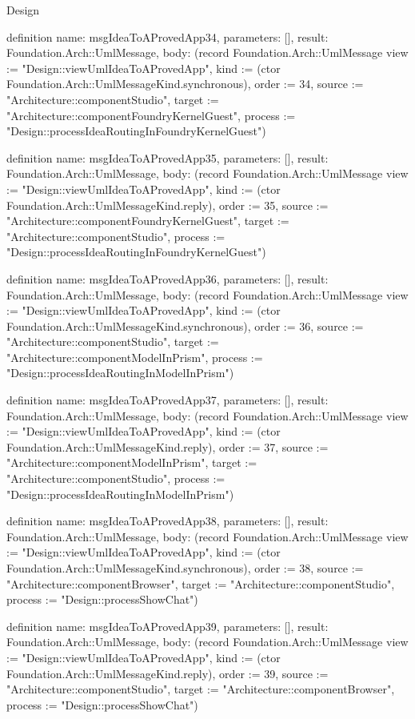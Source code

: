 \begin{lexlean}{Design}
\begin{semanticmodule}
definition{
  name: msgIdeaToAProvedApp34,
  parameters: [],
  result: Foundation.Arch::UmlMessage,
  body: (record Foundation.Arch::UmlMessage {view := "Design::viewUmlIdeaToAProvedApp", kind := (ctor Foundation.Arch::UmlMessageKind.synchronous), order := 34, source := "Architecture::componentStudio", target := "Architecture::componentFoundryKernelGuest", process := "Design::processIdeaRoutingInFoundryKernelGuest"})
}

definition{
  name: msgIdeaToAProvedApp35,
  parameters: [],
  result: Foundation.Arch::UmlMessage,
  body: (record Foundation.Arch::UmlMessage {view := "Design::viewUmlIdeaToAProvedApp", kind := (ctor Foundation.Arch::UmlMessageKind.reply), order := 35, source := "Architecture::componentFoundryKernelGuest", target := "Architecture::componentStudio", process := "Design::processIdeaRoutingInFoundryKernelGuest"})
}

definition{
  name: msgIdeaToAProvedApp36,
  parameters: [],
  result: Foundation.Arch::UmlMessage,
  body: (record Foundation.Arch::UmlMessage {view := "Design::viewUmlIdeaToAProvedApp", kind := (ctor Foundation.Arch::UmlMessageKind.synchronous), order := 36, source := "Architecture::componentStudio", target := "Architecture::componentModelInPrism", process := "Design::processIdeaRoutingInModelInPrism"})
}

definition{
  name: msgIdeaToAProvedApp37,
  parameters: [],
  result: Foundation.Arch::UmlMessage,
  body: (record Foundation.Arch::UmlMessage {view := "Design::viewUmlIdeaToAProvedApp", kind := (ctor Foundation.Arch::UmlMessageKind.reply), order := 37, source := "Architecture::componentModelInPrism", target := "Architecture::componentStudio", process := "Design::processIdeaRoutingInModelInPrism"})
}

definition{
  name: msgIdeaToAProvedApp38,
  parameters: [],
  result: Foundation.Arch::UmlMessage,
  body: (record Foundation.Arch::UmlMessage {view := "Design::viewUmlIdeaToAProvedApp", kind := (ctor Foundation.Arch::UmlMessageKind.synchronous), order := 38, source := "Architecture::componentBrowser", target := "Architecture::componentStudio", process := "Design::processShowChat"})
}

definition{
  name: msgIdeaToAProvedApp39,
  parameters: [],
  result: Foundation.Arch::UmlMessage,
  body: (record Foundation.Arch::UmlMessage {view := "Design::viewUmlIdeaToAProvedApp", kind := (ctor Foundation.Arch::UmlMessageKind.reply), order := 39, source := "Architecture::componentStudio", target := "Architecture::componentBrowser", process := "Design::processShowChat"})
}


\end{semanticmodule}
\end{lexlean}
